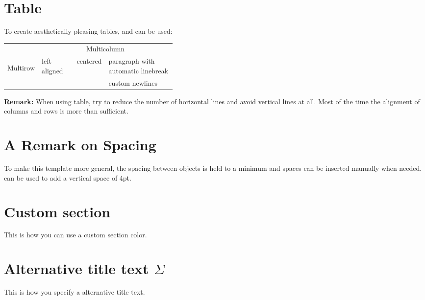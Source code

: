 \documentclass[\fontheight]{extarticle}
\begin{document}
\begin{multicols*}{3}
    \section{Table}
    To create aesthetically pleasing tables,  and  can be used:
    \newpar{}
    \renewcommand{\arraystretch}{1.3}
    \setlength\tabcolsep{6pt} %
    \begin{tabularx}{\linewidth}{@{}llcp{0.4\linewidth}@{}}
        \toprule
                                                                & \multicolumn{3}{c}{Multicolumn}                                                                                        \\
        \cmidrule{2-4}
        \multirow{2}{*}{\begin{sideways}Multirow\end{sideways}} & left aligned                    & centered & paragraph with automatic linebreak    \\
        \cmidrule{2-4}
        \morecmidrules\cmidrule{2-4}
        &                                 &          & custom new\newline lines                                                                         \\
        \bottomrule
    \end{tabularx}
    \renewcommand{\arraystretch}{1}
    \setlength\tabcolsep{6pt} %
    \textbf{Remark:} When using table, try to reduce the number of horizontal lines and avoid vertical lines at all.
    Most of the time the alignment of columns and rows is more than sufficient.

    \section{A Remark on Spacing}
    To make this template more general, the spacing between objects is held to a minimum and spaces can be inserted manually when needed.
     can be used to add a vertical space of 4pt.


    \section[][customSectionColor]{Custom section}
    This is how you can use a custom section color.

    \section[Alternative title text Sigma]{Alternative title text $\Sigma$}
    This is how you specify a alternative title text.

    \tableofcontents


\end{multicols*}
\end{document}
